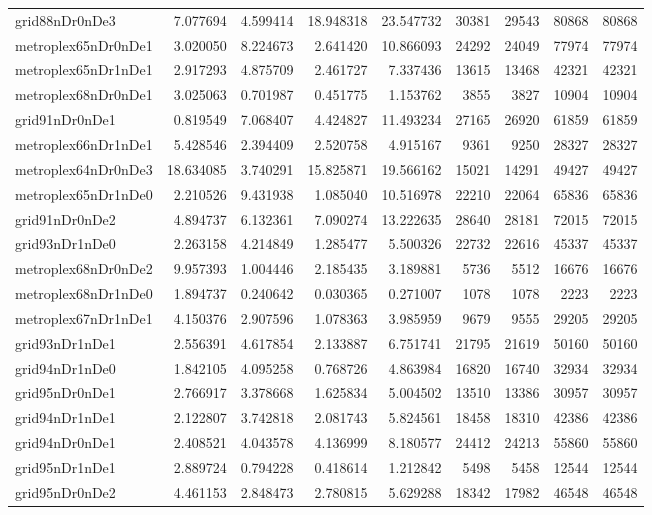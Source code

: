 \begin{longtable}{|l|r|r|r|r|r|r|r|r|}
grid88nDr0nDe3 & 7.077694 & 4.599414 & 18.948318 & 23.547732 & 30381 & 29543 & 80868 & 80868 \\
metroplex65nDr0nDe1 & 3.020050 & 8.224673 & 2.641420 & 10.866093 & 24292 & 24049 & 77974 & 77974 \\
metroplex65nDr1nDe1 & 2.917293 & 4.875709 & 2.461727 & 7.337436 & 13615 & 13468 & 42321 & 42321 \\
metroplex68nDr0nDe1 & 3.025063 & 0.701987 & 0.451775 & 1.153762 & 3855 & 3827 & 10904 & 10904 \\
grid91nDr0nDe1 & 0.819549 & 7.068407 & 4.424827 & 11.493234 & 27165 & 26920 & 61859 & 61859 \\
metroplex66nDr1nDe1 & 5.428546 & 2.394409 & 2.520758 & 4.915167 & 9361 & 9250 & 28327 & 28327 \\
metroplex64nDr0nDe3 & 18.634085 & 3.740291 & 15.825871 & 19.566162 & 15021 & 14291 & 49427 & 49427 \\
metroplex65nDr1nDe0 & 2.210526 & 9.431938 & 1.085040 & 10.516978 & 22210 & 22064 & 65836 & 65836 \\
grid91nDr0nDe2 & 4.894737 & 6.132361 & 7.090274 & 13.222635 & 28640 & 28181 & 72015 & 72015 \\
grid93nDr1nDe0 & 2.263158 & 4.214849 & 1.285477 & 5.500326 & 22732 & 22616 & 45337 & 45337 \\
metroplex68nDr0nDe2 & 9.957393 & 1.004446 & 2.185435 & 3.189881 & 5736 & 5512 & 16676 & 16676 \\
metroplex68nDr1nDe0 & 1.894737 & 0.240642 & 0.030365 & 0.271007 & 1078 & 1078 & 2223 & 2223 \\
metroplex67nDr1nDe1 & 4.150376 & 2.907596 & 1.078363 & 3.985959 & 9679 & 9555 & 29205 & 29205 \\
grid93nDr1nDe1 & 2.556391 & 4.617854 & 2.133887 & 6.751741 & 21795 & 21619 & 50160 & 50160 \\
grid94nDr1nDe0 & 1.842105 & 4.095258 & 0.768726 & 4.863984 & 16820 & 16740 & 32934 & 32934 \\
grid95nDr0nDe1 & 2.766917 & 3.378668 & 1.625834 & 5.004502 & 13510 & 13386 & 30957 & 30957 \\
grid94nDr1nDe1 & 2.122807 & 3.742818 & 2.081743 & 5.824561 & 18458 & 18310 & 42386 & 42386 \\
grid94nDr0nDe1 & 2.408521 & 4.043578 & 4.136999 & 8.180577 & 24412 & 24213 & 55860 & 55860 \\
grid95nDr1nDe1 & 2.889724 & 0.794228 & 0.418614 & 1.212842 & 5498 & 5458 & 12544 & 12544 \\
grid95nDr0nDe2 & 4.461153 & 2.848473 & 2.780815 & 5.629288 & 18342 & 17982 & 46548 & 46548 \\

\end{longtable}

